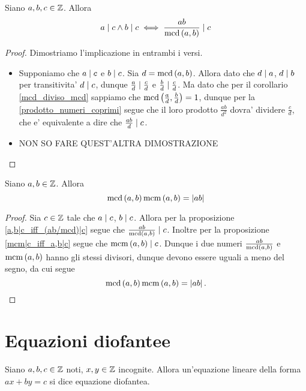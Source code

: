 \begin{proposition}\label{a,b|c_iff_(ab/mcd)|c}
    Siano $a, b, c \in \mathbb{Z}$. Allora \begin{equation}
        a \mid c \land b \mid c \iff \frac{ab}{\operatorname{mcd}\left(a, b\right)} \mid c
    \end{equation}
\end{proposition}
\begin{proof}
    Dimostriamo l'implicazione in entrambi i versi.
    \begin{itemize}
        \item Supponiamo che $a \mid c$ e $b \mid c$. Sia $d = \operatorname{mcd}\left(a, b\right)$. Allora dato che $d \mid a$, $d \mid b$ per transitivita' $d \mid c$, dunque $\frac{a}{d} \mid \frac{c}{d}$ e $\frac{b}{d} \mid \frac{c}{d}$. Ma dato che per il corollario \ref{mcd_diviso_mcd} sappiamo che $\operatorname{mcd}\left(\frac{a}{d}, \frac{b}{d}\right) = 1$, dunque per la \ref{prodotto_numeri_coprimi} segue che il loro prodotto $\frac{ab}{d^2}$ dovra' dividere $\frac{c}{d}$, che e' equivalente a dire che $\frac{ab}{d} \mid c$.
        \item NON SO FARE QUEST'ALTRA DIMOSTRAZIONE
    \end{itemize}
\end{proof}

\begin{proposition}
    \label{mcm*mcd=ab}
    Siano $a, b \in \mathbb{Z}$. Allora
    \begin{equation}
        \operatorname{mcd}\left(a, b\right)\operatorname{mcm}\left(a, b\right) = \left|ab\right|
    \end{equation}
\end{proposition}
\begin{proof}
    Sia $c \in \mathbb{Z}$ tale che $a \mid c$, $b \mid c$. Allora per la proposizione \ref{a,b|c_iff_(ab/mcd)|c} segue che $\frac{ab}{\operatorname{mcd}\left(a, b\right)} \mid c$. Inoltre per la proposizione \ref{mcm|c_iff_a,b|c} segue che $\operatorname{mcm}\left(a, b\right) \mid c$.
    Dunque i due numeri $\frac{ab}{\operatorname{mcd}\left(a, b\right)}$ e $\operatorname{mcm}\left(a, b\right)$ hanno gli stessi divisori, dunque devono essere uguali a meno del segno, da cui segue \[
        \operatorname{mcd}\left(a, b\right)\operatorname{mcm}\left(a, b\right) = \left|ab\right|. 
    \]
\end{proof}

\section{Equazioni diofantee}

\begin{definition}
    Siano $a, b, c \in \mathbb{Z}$ noti, $x, y \in \mathbb{Z}$ incognite. Allora un'equazione
    lineare della forma $ax + by = c$ si dice equazione diofantea.
\end{definition}


